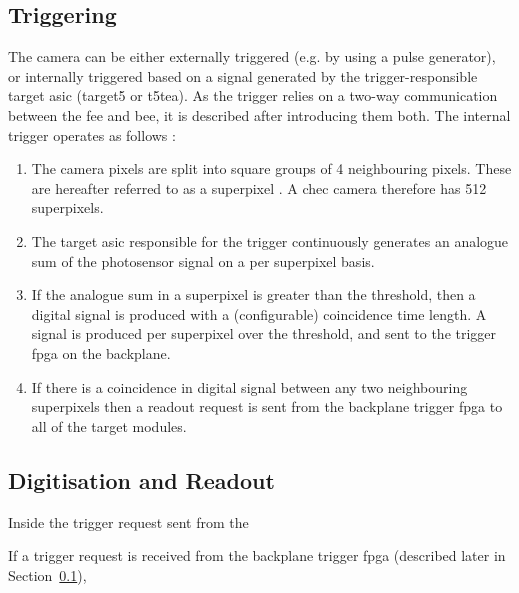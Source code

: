 \subsection{Triggering} \label{section:triggering}

The camera can be either externally triggered (e.g. by using a pulse generator), or internally triggered based on a signal generated by the trigger-responsible \gls{target} \gls{asic} (\gls{target5} or \gls{t5tea}). As the trigger relies on a two-way communication between the \gls{fee} and \gls{bee}, it is described after introducing them both. The internal trigger operates as follows \cite{Zorn2017}:
\begin{enumerate}
\item The camera pixels are split into square groups of 4 neighbouring pixels. These are hereafter referred to as a superpixel . A \gls{chec} camera therefore has 512 superpixels.
\item The \gls{target} \gls{asic} responsible for the trigger continuously generates an analogue sum of the photosensor signal on a per superpixel basis.
\item If the analogue sum in a superpixel is greater than the threshold, then a digital signal is produced with a (configurable) coincidence time length. A signal is produced per superpixel over the threshold, and sent to the trigger \gls{fpga} on the backplane.
\item If there is a coincidence in digital signal between any two neighbouring superpixels then a readout request is sent from the backplane trigger \gls{fpga} to all of the \gls{target} modules.
\end{enumerate}

\subsection{Digitisation and Readout}

Inside the trigger request sent from the 

If a trigger request is received from the backplane trigger \gls{fpga} (described later in Section~\ref{section:triggering}), 





